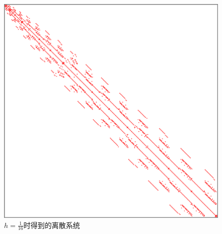 \documentclass[lang=cn,11pt,a4paper]{elegantpaper}
\begin{document}
\begin{figure}[H]
\begin{minipage}[t]{0.4\textwidth}
        \includegraphics[width=0.8\linewidth]{fig/sparsity-pattern.png}
        \caption{$h=\frac{1}{16}$时得到的离散系统}
    \end{minipage}
\end{figure}
\end{document}
